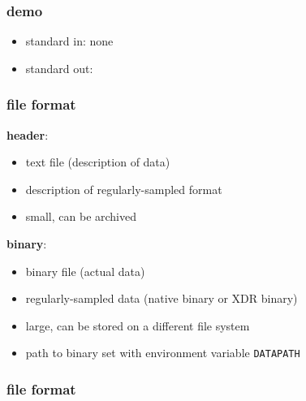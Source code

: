 \begin{frame}[fragile] \frametitle{demo}

  
  \vfill
  \begin{itemize}
  \item standard in: none
  \item standard out: 
  \end{itemize}
  
\end{frame}
\cwpnote{}

\begin{frame} \frametitle{file format}

  \textbf{header}:
  \begin{itemize}
  \item text file (description of data)
  \item description of regularly-sampled format
  \item small, can be archived
  \end{itemize}
  
  \textbf{binary}:
  \begin{itemize}
  \item binary file (actual data)
  \item regularly-sampled data (native binary or XDR binary)
  \item large, can be stored on a different file system
  \item path to binary set with environment variable \texttt{DATAPATH}
  \end{itemize}
  
\end{frame}
\cwpnote{}


\begin{frame} \frametitle{file format}
\end{frame}
\cwpnote{}

